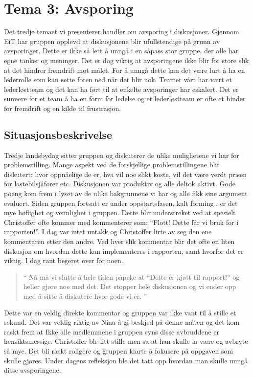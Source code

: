 \chapter{Tema 3: Avsporing}

Det tredje temaet vi presenterer handler om avsporing i diskusjoner. Gjennom EiT har gruppen opplevd at diskusjonene
blir ufullstendige på grunn av avsporinger. Dette er ikke så lett å unngå i en såpass stor gruppe, der alle har egne tanker og meninger.
Det er dog viktig at avsporingene ikke blir for store slik at det hindrer fremdrift mot målet. For å unngå dette kan det være lurt
å ha en lederrolle som kan sette foten ned når det blir nok. Teamet vårt har vært et lederløstteam og det kan ha ført til at 
enkelte avsporinger har eskalert. Det er sunnere for et team å ha en form for ledelse og et lederløstteam er ofte et hinder for 
fremdrift og en kilde til frustrasjon. \cite{Artikkel4}

\section{Situasjonsbeskrivelse}
Tredje landsbydag sitter gruppen og diskuterer de ulike mulighetene vi har for problemstilling. Mange aspekt ved de forskjellige 
problemstillingene blir diskutert: hvor oppnåelige de er, hva vil noe slikt koste, vil det være verdt prisen for lastebilsjåfører etc. Diskusjonen var
produktiv og alle deltok aktivt. Gode poeng kom frem i lyset av de ulike bakgrunnene vi har og alle fikk sine argument evaluert. 
Siden gruppen fortsatt er under oppstartsfasen, kalt forming 
\cite{forming}, er det mye høflighet og vennlighet i gruppen. Dette blir understreket ved at spesielt Christoffer ofte kommer med kommenterer 
som: ``Flott! Dette får vi bruk for i rapporten!''. I dag var intet untakk og Christoffer lirte av seg den ene kommentaren etter den andre. Ved hver 
slik kommentar blir det ofte en liten diskusjon om hvordan dette kan implementeres i 
rapporten, samt hvorfor det er viktig. I dag rant begeret over for noen.

\begin{quote}``
Nå må vi slutte å hele tiden påpeke at ``Dette er kjøtt til rapport!'' og heller gjøre noe med det. Det stopper hele diskusjonen og vi
ender opp med å sitte å diskutere hvor gode vi er. 
''\end{quote} 

Dette var en veldig direkte kommentar og gruppen var ikke vant til å stille et sekund. Det var veldig riktig av Nina å gi beskjed på denne 
måten og det kom raskt frem at Ikke alle medlemmene i gruppen syns disse avbruddene er hensiktsmessige. 
Christoffer ble litt stille men sa at han skulle la være og avbryte
så mye. Det bli raskt roligere og gruppen klarte å fokusere på oppgaven som skulle gjøres. Under dagens refleksjon ble det tatt opp hvordan 
man skulle unngå disse avsporingene. 

